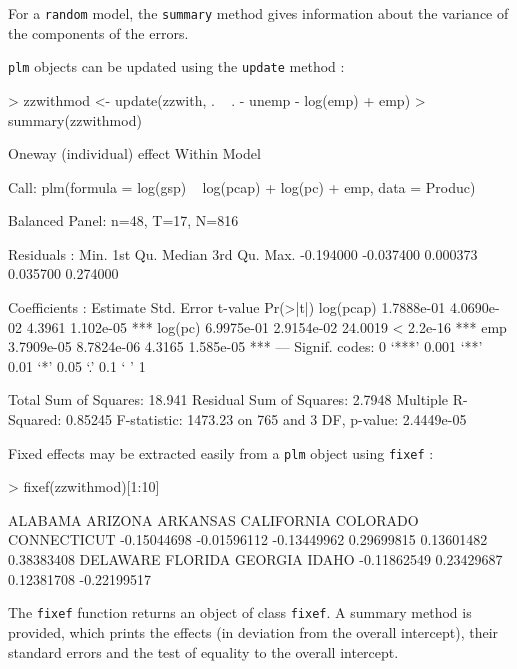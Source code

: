 \documentclass[a4paper]{article}
\begin{document}
For a \texttt{random} model, the \texttt{summary} method gives
information about the variance of the components of the errors.

\texttt{plm} objects can be updated using the \texttt{update} method :

\begin{Schunk}
\begin{Sinput}
> zzwithmod <- update(zzwith, . ~ . - unemp - log(emp) + emp)
> summary(zzwithmod)
\end{Sinput}
\begin{Soutput}
Oneway (individual) effect Within Model

Call:
plm(formula = log(gsp) ~ log(pcap) + log(pc) + emp, data = Produc)

Balanced Panel: n=48, T=17, N=816

Residuals :
     Min.   1st Qu.    Median   3rd Qu.      Max. 
-0.194000 -0.037400  0.000373  0.035700  0.274000 

Coefficients :
            Estimate Std. Error t-value  Pr(>|t|)    
log(pcap) 1.7888e-01 4.0690e-02  4.3961 1.102e-05 ***
log(pc)   6.9975e-01 2.9154e-02 24.0019 < 2.2e-16 ***
emp       3.7909e-05 8.7824e-06  4.3165 1.585e-05 ***
---
Signif. codes:  0 ‘***’ 0.001 ‘**’ 0.01 ‘*’ 0.05 ‘.’ 0.1 ‘ ’ 1 

Total Sum of Squares: 18.941
Residual Sum of Squares: 2.7948
Multiple R-Squared: 0.85245
F-statistic: 1473.23 on 765 and 3 DF, p-value: 2.4449e-05
\end{Soutput}
\end{Schunk}

Fixed effects may be extracted easily from a \texttt{plm} object using
\texttt{fixef} :

\begin{Schunk}
\begin{Sinput}
> fixef(zzwithmod)[1:10]
\end{Sinput}
\begin{Soutput}
    ALABAMA     ARIZONA    ARKANSAS  CALIFORNIA    COLORADO CONNECTICUT 
-0.15044698 -0.01596112 -0.13449962  0.29699815  0.13601482  0.38383408 
   DELAWARE     FLORIDA     GEORGIA       IDAHO 
-0.11862549  0.23429687  0.12381708 -0.22199517 
\end{Soutput}
\end{Schunk}

The \texttt{fixef} function returns an object of class \texttt{fixef}. A
summary method is provided, which prints the effects (in deviation
from the overall intercept), their standard
errors and the test of equality to the overall intercept.
\end{document}
